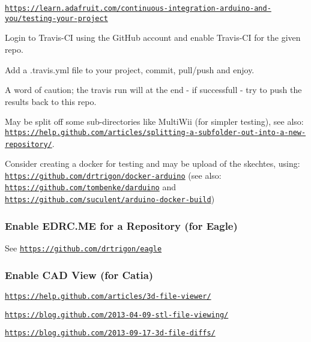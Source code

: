 \href{https://learn.adafruit.com/continuous-integration-arduino-and-you/testing-your-project}{\tt https\-://learn.\-adafruit.\-com/continuous-\/integration-\/arduino-\/and-\/you/testing-\/your-\/project}

Login to Travis-\/\-C\-I using the Git\-Hub account and enable Travis-\/\-C\-I for the given repo.

Add a .travis.\-yml file to your project, commit, pull/push and enjoy.

A word of caution; the travis run will at the end -\/ if successfull -\/ try to push the results back to this repo.

May be split off some sub-\/directories like Multi\-Wii (for simpler testing), see also\-: \href{https://help.github.com/articles/splitting-a-subfolder-out-into-a-new-repository/}{\tt https\-://help.\-github.\-com/articles/splitting-\/a-\/subfolder-\/out-\/into-\/a-\/new-\/repository/}.

Consider creating a docker for testing and may be upload of the skechtes, using\-: \href{https://github.com/drtrigon/docker-arduino}{\tt https\-://github.\-com/drtrigon/docker-\/arduino} (see also\-: \href{https://github.com/tombenke/darduino}{\tt https\-://github.\-com/tombenke/darduino} and \href{https://github.com/suculent/arduino-docker-build}{\tt https\-://github.\-com/suculent/arduino-\/docker-\/build})

\subsubsection*{Enable E\-D\-R\-C.\-M\-E for a Repository (for Eagle)}

See \href{https://github.com/drtrigon/eagle}{\tt https\-://github.\-com/drtrigon/eagle}

\subsubsection*{Enable C\-A\-D View (for Catia)}


\begin{DoxyItemize}
\item \href{https://help.github.com/articles/3d-file-viewer/}{\tt https\-://help.\-github.\-com/articles/3d-\/file-\/viewer/}
\item \href{https://blog.github.com/2013-04-09-stl-file-viewing/}{\tt https\-://blog.\-github.\-com/2013-\/04-\/09-\/stl-\/file-\/viewing/}
\item \href{https://blog.github.com/2013-09-17-3d-file-diffs/}{\tt https\-://blog.\-github.\-com/2013-\/09-\/17-\/3d-\/file-\/diffs/}
\end{DoxyItemize}

